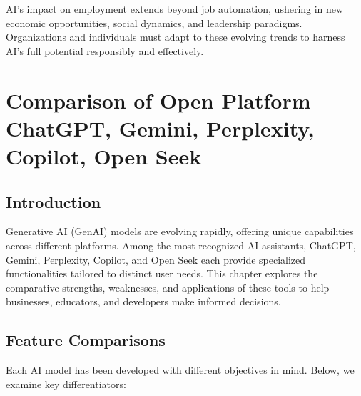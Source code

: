 \documentclass[a4paper,headinclude=on,footinclude=on,12pt,oneside]{scrbook}
\begin{document}

AI’s impact on employment extends beyond job automation, ushering in new economic opportunities, social dynamics, and leadership paradigms. Organizations and individuals must adapt to these evolving trends to harness AI’s full potential responsibly and effectively.




\chapter{Comparison of Open Platform ChatGPT, Gemini, Perplexity, Copilot, Open Seek}


\section{Introduction}

Generative AI (GenAI) models are evolving rapidly, offering unique capabilities across different platforms. Among the most recognized AI assistants, ChatGPT, Gemini, Perplexity, Copilot, and Open Seek each provide specialized functionalities tailored to distinct user needs. This chapter explores the comparative strengths, weaknesses, and applications of these tools to help businesses, educators, and developers make informed decisions.

\section{Feature Comparisons}

Each AI model has been developed with different objectives in mind. Below, we examine key differentiators:
\end{document}

